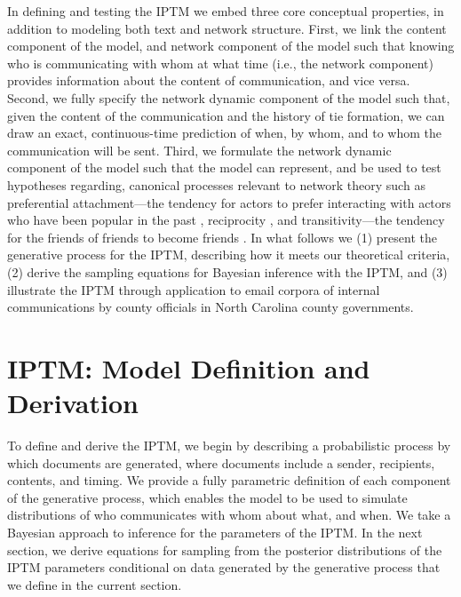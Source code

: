 \documentclass[a4paper]{article}
\begin{document}
In defining and testing the IPTM we embed three core conceptual properties, in addition to modeling both text and network structure. First, we link the content component of the model, and network component of the model such that knowing who is communicating with whom at what time (i.e., the network component) provides information about the content of communication,  and vice versa. Second, we fully specify the network dynamic component of the model such that, given the content of the communication and the history of tie formation, we can draw an exact, continuous-time prediction of when, by whom, and to whom the communication will be sent. Third, we formulate the network dynamic component of the model such that the model can represent, and be used to test hypotheses regarding, canonical processes relevant to network theory such as preferential attachment---the tendency for actors to prefer interacting with actors who have been popular in the past \citep{barabasi1999emergence,vazquez2003growing,jeong2003measuring}, reciprocity \citep{hammer1985implications,rao1987measures}, and transitivity---the tendency for the friends of friends to become friends \citep{louch2000personal,burda2004network}. In what follows we (1) present the generative process for the IPTM, describing how it meets our theoretical criteria, (2) derive the sampling equations for Bayesian inference with the IPTM, and (3) illustrate the IPTM through application to email corpora of internal communications by county officials in North Carolina county governments. 

\section{IPTM: Model Definition and Derivation} \label{sec: Generative Process}

To define and derive the IPTM, we begin by describing a probabilistic process by which documents are generated, where documents include a sender, recipients, contents, and timing. We provide a fully parametric definition of each component of the generative process, which enables the model to be used to simulate distributions of who communicates with whom about what, and when. We take a Bayesian approach to inference for the parameters of the IPTM. In the next section, we derive equations for sampling from the posterior distributions of the IPTM parameters conditional on data generated by the generative process that we define in the current section.
\end{document}
